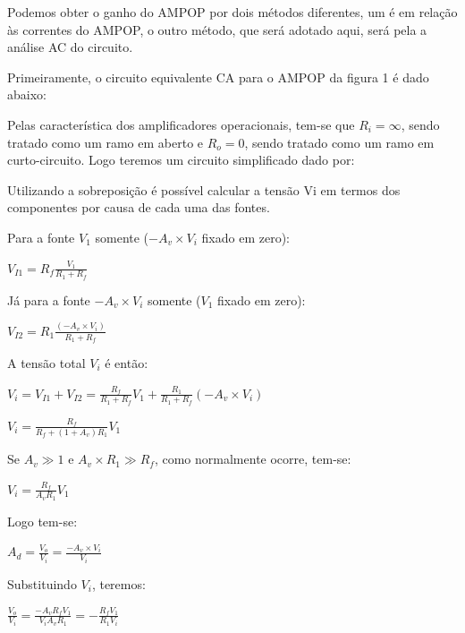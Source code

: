 Podemos obter o ganho do AMPOP por dois métodos diferentes, um é em relação às correntes do AMPOP, o outro método, que será adotado aqui, será pela a análise AC do circuito.

Primeiramente, o circuito equivalente CA para o AMPOP da figura 1 é dado abaixo:



Pelas característica dos amplificadores operacionais, tem-se que $R_i=\infty$, sendo tratado como um ramo em aberto e $R_o = 0$, sendo tratado como um ramo em curto-circuito. Logo teremos um circuito simplificado dado por:



Utilizando a sobreposição é possível calcular a tensão Vi em termos dos componentes por causa de cada uma das fontes.

Para a fonte $V_1$ somente ($-A_v \times V_i$ fixado em zero):

\begin{center}
    $V_{I1} = R_f \frac{V_1}{R_1+R_f} $
\end{center}

Já para a fonte $-A_v \times V_i$  somente ($V_1$ fixado em zero):

\begin{center}
    $V_{I2} = R_1 \frac{(-A_v \times V_i)}{R_1+R_f} $
\end{center}

A tensão total $V_i$ é então:

\begin{center}
    $V_{i} = V_{I1} + V_{I2}  =  \frac{R_f}{R_1+R_f}V_1 + \frac{R_1}{R_1+R_f}(-A_v \times V_i) $
    
    $V_{i} =  \frac{R_f}{R_f + (1+A_v)R_1 }V_1$
\end{center}

Se $A_v \gg 1$ e $A_v \times R_1 \gg  R_f$, como normalmente ocorre, tem-se:

\begin{center}
    $V_{i} =  \frac{R_f}{A_vR_1 }V_1$
\end{center}

Logo tem-se: 

\begin{center}
    $A_{d} = \frac{V_o}{V_i} = \frac{- A_v \times V_i}{V_i} $
\end{center}

Substituindo $V_i$, teremos: 

\begin{center}
    $\frac{V_o}{V_i} = \frac{- A_v R_f V_1}{V_i A_v R_1} = -\frac{ R_f V_1}{R_1 V_i} $
\end{center}

